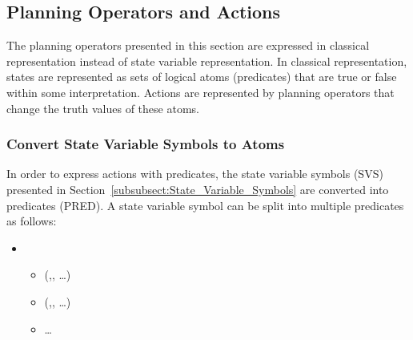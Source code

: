 
\subsection{Planning Operators and Actions}
\label{subsect:Planning_Operators}
The planning operators presented in this section are expressed in classical representation instead of state variable representation. In classical representation, states are represented as sets of logical atoms (predicates) that are true or false within some interpretation. Actions are represented by planning operators that change the truth values of these atoms.

\subsubsection{Convert State Variable Symbols to Atoms}
In order to express actions with predicates, the state variable symbols (SVS) presented in Section~\ref{subsubsect:State_Variable_Symbols} are converted into predicates (PRED). A state variable symbol can be split into multiple predicates as follows:
\begin{itemize}
 \item {}
  \begin{itemize}
  \item {} (,, \ldots)
  \item {} (,, \ldots)
  \item \ldots
  \end{itemize}
\end{itemize}


